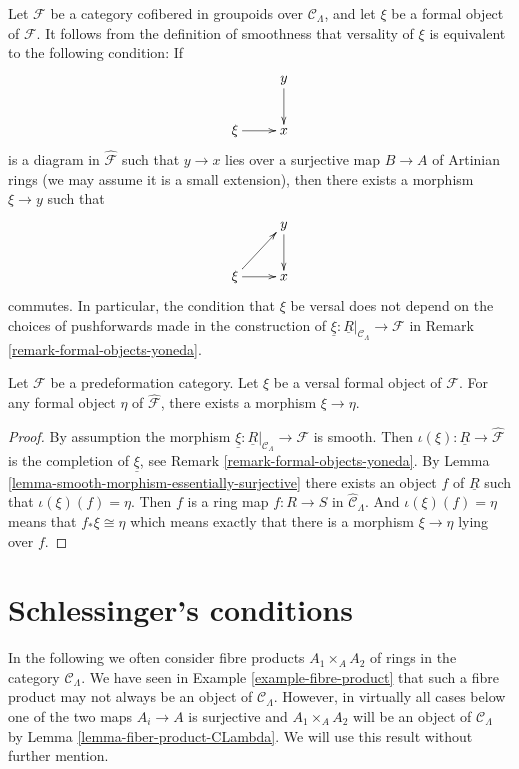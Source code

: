 \begin{remark}
\label{remark-versal-object}
Let $\mathcal{F}$ be a category cofibered in groupoids over $\mathcal 
C_\Lambda$, and let $\xi$ be a formal object of $\mathcal{F}$.  It follows 
from the definition of smoothness that versality of $\xi$ is equivalent to the 
following condition: If 
$$
\xymatrix{
& y \ar[d] \\
\xi \ar[r] & x
}
$$
is a diagram in $\widehat{\mathcal{F}}$ such that $y \to x$ lies over a 
surjective map $B \to A$ of Artinian rings (we may assume it is a small 
extension),  then there exists a morphism $\xi \to y$ such that
$$
\xymatrix{
& y \ar[d] \\
\xi \ar[r] \ar[ur] & x
}
$$ 
commutes. In particular, the condition that $\xi$ be versal does not depend on 
the choices of pushforwards made in the construction of
$\underline{\xi} : \underline{R}|_{\mathcal{C}_\Lambda} \to \mathcal{F}$ in
Remark \ref{remark-formal-objects-yoneda}.
\end{remark}

\begin{lemma}
\label{lemma-versal-object-quasi-initial}
Let $\mathcal{F}$ be a predeformation category.
Let $\xi$ be a versal formal object of $\mathcal{F}$.
For any formal object $\eta$ of $\widehat{\mathcal{F}}$,
there exists a morphism $\xi \to \eta$.
\end{lemma}

\begin{proof}
By assumption the morphism
$\underline{\xi} : \underline{R}|_{\mathcal{C}_\Lambda} \to \mathcal{F}$
is smooth. Then
$\iota(\xi) : \underline{R} \to \widehat{\mathcal{F}}$
is the completion of $\underline{\xi}$, see
Remark \ref{remark-formal-objects-yoneda}.
By
Lemma \ref{lemma-smooth-morphism-essentially-surjective}
there exists an object $f$ of $\underline{R}$ such that
$\iota(\xi)(f) = \eta$. Then $f$ is
a ring map $f : R \to S$ in $\widehat{\mathcal{C}}_\Lambda$. And
$\iota(\xi)(f) = \eta$ means that
$f_*\xi \cong \eta$ which means exactly that there is a morphism
$\xi \to \eta$ lying over $f$.
\end{proof}






\section{Schlessinger's conditions}
\label{section-schlessinger-conditions}

\noindent
In the following we often consider fibre products $A_1 \times_A A_2$
of rings in the category $\mathcal{C}_\Lambda$. We have seen in
Example \ref{example-fibre-product}
that such a fibre product may not always be an object of
$\mathcal{C}_\Lambda$. However, in virtually all cases below one of the
two maps $A_i \to A$ is surjective and $A_1 \times_A A_2$ will be
an object of $\mathcal{C}_\Lambda$ by
Lemma \ref{lemma-fiber-product-CLambda}.
We will use this result without further mention.

